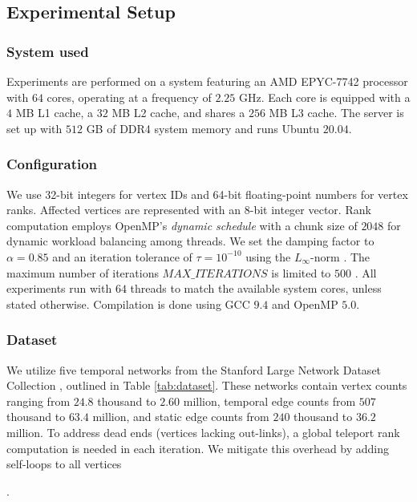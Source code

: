 \subsection{Experimental Setup}
\label{sec:setup}

\subsubsection{System used}

Experiments are performed on a system featuring an AMD EPYC-7742 processor with $64$ cores, operating at a frequency of $2.25$ GHz. Each core is equipped with a $4$ MB L1 cache, a $32$ MB L2 cache, and shares a $256$ MB L3 cache. The server is set up with $512$ GB of DDR4 system memory and runs Ubuntu $20.04$.


\subsubsection{Configuration}

We use 32-bit integers for vertex IDs and 64-bit floating-point numbers for vertex ranks. Affected vertices are represented with an 8-bit integer vector. Rank computation employs OpenMP's \textit{dynamic schedule} with a chunk size of $2048$ for dynamic workload balancing among threads. We set the damping factor to $\alpha = 0.85$ \cite{rank-langville06} and an iteration tolerance of $\tau = 10^{-10}$ using the $L_\infty$-norm \cite{rank-dubey22, rank-plimpton11}. The maximum number of iterations $MAX\_ITERATIONS$ is limited to $500$ \cite{nvgraph}. All experiments run with $64$ threads to match the available system cores, unless stated otherwise. Compilation is done using GCC $9.4$ and OpenMP $5.0$.


\subsubsection{Dataset}
\label{sec:dataset}

We utilize five temporal networks from the Stanford Large Network Dataset Collection \cite{snapnets}, outlined in Table \ref{tab:dataset}. These networks contain vertex counts ranging from $24.8$ thousand to $2.60$ million, temporal edge counts from $507$ thousand to $63.4$ million, and static edge counts from $240$ thousand to $36.2$ million. To address dead ends (vertices lacking out-links), a global teleport rank computation is needed in each iteration. We mitigate this overhead by adding self-loops to all vertices \cite{kolda2009generalized, rank-andersen07, rank-langville06}.

